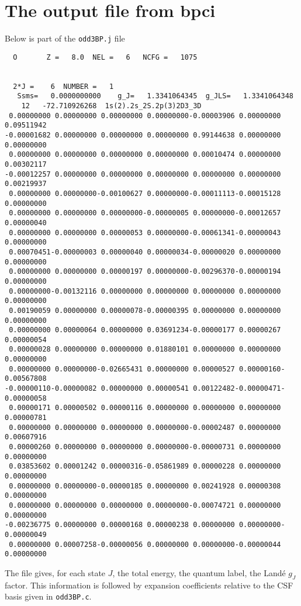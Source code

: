 \documentclass[fleqn,10pt]{book}
\begin{document}
\section{The output file from bpci}
Below is part of the \verb+odd3BP.j+ file
\begin{verbatim}
  O       Z =   8.0  NEL =   6   NCFG =   1075                                                                                                                                                


  2*J =    6  NUMBER =   1
   Ssms=   0.0000000000    g_J=   1.3341064345  g_JLS=   1.3341064348
    12   -72.710926268  1s(2).2s_2S.2p(3)2D3_3D
 0.00000000 0.00000000 0.00000000 0.00000000-0.00003906 0.00000000 0.09511942
-0.00001682 0.00000000 0.00000000 0.00000000 0.99144638 0.00000000 0.00000000
 0.00000000 0.00000000 0.00000000 0.00000000 0.00010474 0.00000000 0.00302117
-0.00012257 0.00000000 0.00000000 0.00000000 0.00000000 0.00000000 0.00219937
 0.00000000 0.00000000-0.00100627 0.00000000-0.00011113-0.00015128 0.00000000
 0.00000000 0.00000000 0.00000000-0.00000005 0.00000000-0.00012657 0.00000040
 0.00000000 0.00000000 0.00000053 0.00000000-0.00061341-0.00000043 0.00000000
 0.00070451-0.00000003 0.00000040 0.00000034-0.00000020 0.00000000 0.00000000
 0.00000000 0.00000000 0.00000197 0.00000000-0.00296370-0.00000194 0.00000000
 0.00000000-0.00132116 0.00000000 0.00000000 0.00000000 0.00000000 0.00000000
 0.00190059 0.00000000 0.00000078-0.00000395 0.00000000 0.00000000 0.00000000
 0.00000000 0.00000064 0.00000000 0.03691234-0.00000177 0.00000267 0.00000054
 0.00000028 0.00000000 0.00000000 0.01880101 0.00000000 0.00000000 0.00000000
 0.00000000 0.00000000-0.02665431 0.00000000 0.00000527 0.00000160-0.00567808
-0.00000110-0.00000082 0.00000000 0.00000541 0.00122482-0.00000471-0.00000058
 0.00000171 0.00000502 0.00000116 0.00000000 0.00000000 0.00000000 0.00000781
 0.00000000 0.00000000 0.00000000 0.00000000-0.00002487 0.00000000 0.00607916
 0.00000260 0.00000000 0.00000000 0.00000000-0.00000731 0.00000000 0.00000000
 0.03853602 0.00001242 0.00000316-0.05861989 0.00000228 0.00000000 0.00000000
 0.00000000 0.00000000-0.00000185 0.00000000 0.00241928 0.00000308 0.00000000
 0.00000000 0.00000000 0.00000000 0.00000000-0.00074721 0.00000000 0.00000000
-0.00236775 0.00000000 0.00000168 0.00000238 0.00000000 0.00000000-0.00000049
 0.00000000 0.00007258-0.00000056 0.00000000 0.00000000-0.00000044 0.00000000
\end{verbatim}
The file gives, for each state $J$, the total energy, the quantum label, the Land\'e $g_J$ factor. This information is followed by expansion coefficients relative to the CSF basis given in \verb+odd3BP.c+. 
\end{document}
